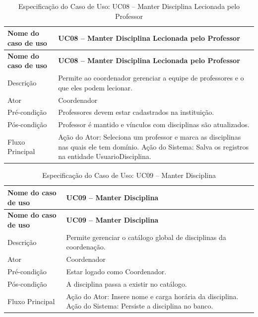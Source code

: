 \fonteautores

\vspace{\baselineskip}

\Needspace{0.48\textheight}
\begin{longtable}{|L{4.5cm}|L{10.5cm}|}
\caption{Especificação do Caso de Uso: UC08 -- Manter Disciplina Lecionada pelo Professor} \\
\hline
\textbf{Nome do caso de uso} & \textbf{UC08 -- Manter Disciplina Lecionada pelo Professor} \\
\hline
\endfirsthead
\hline
\textbf{Nome do caso de uso} & \textbf{UC08 -- Manter Disciplina Lecionada pelo Professor} \\
\hline
\endhead
Descrição       & Permite ao coordenador gerenciar a equipe de professores e o que eles podem lecionar. \\
\hline
Ator            & Coordenador \\
\hline
Pré-condição    & Professores devem estar cadastrados na instituição. \\
\hline
Pós-condição    & Professor é mantido e vínculos com disciplinas são atualizados. \\
\hline
Fluxo Principal & Ação do Ator: Seleciona um professor e marca as disciplinas nas quais ele tem domínio. Ação do Sistema: Salva os registros na entidade UsuarioDisciplina. \\
\hline
\end{longtable}

\fonteautores

\vspace{\baselineskip}

\Needspace{0.48\textheight}
\begin{longtable}{|L{4.5cm}|L{10.5cm}|}
\caption{Especificação do Caso de Uso: UC09 -- Manter Disciplina} \\
\hline
\textbf{Nome do caso de uso} & \textbf{UC09 -- Manter Disciplina} \\
\hline
\endfirsthead
\hline
\textbf{Nome do caso de uso} & \textbf{UC09 -- Manter Disciplina} \\
\hline
\endhead
Descrição       & Permite gerenciar o catálogo global de disciplinas da coordenação. \\
\hline
Ator            & Coordenador \\
\hline
Pré-condição    & Estar logado como Coordenador. \\
\hline
Pós-condição    & A disciplina passa a existir no catálogo. \\
\hline
Fluxo Principal & Ação do Ator: Insere nome e carga horária da disciplina. Ação do Sistema: Persiste a disciplina no banco. \\
\hline
\end{longtable}

